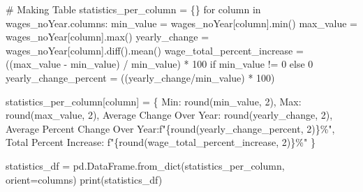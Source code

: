 \documentclass[
  letterpaper,
  DIV=11,
  numbers=noendperiod]{scrartcl}
\newenvironment{Shaded}{\begin{snugshade}}{\end{snugshade}}
\newcommand{\BuiltInTok}[1]{\textcolor[rgb]{0.00,0.23,0.31}{#1}}
\newcommand{\CommentTok}[1]{\textcolor[rgb]{0.37,0.37,0.37}{#1}}
\newcommand{\ControlFlowTok}[1]{\textcolor[rgb]{0.00,0.23,0.31}{#1}}
\newcommand{\DecValTok}[1]{\textcolor[rgb]{0.68,0.00,0.00}{#1}}
\newcommand{\KeywordTok}[1]{\textcolor[rgb]{0.00,0.23,0.31}{#1}}
\newcommand{\NormalTok}[1]{\textcolor[rgb]{0.00,0.23,0.31}{#1}}
\newcommand{\OperatorTok}[1]{\textcolor[rgb]{0.37,0.37,0.37}{#1}}
\newcommand{\SpecialCharTok}[1]{\textcolor[rgb]{0.37,0.37,0.37}{#1}}
\newcommand{\SpecialStringTok}[1]{\textcolor[rgb]{0.13,0.47,0.30}{#1}}
\newcommand{\StringTok}[1]{\textcolor[rgb]{0.13,0.47,0.30}{#1}}
\begin{document}
\begin{Shaded}
\begin{Highlighting}[]
\CommentTok{\# Making Table}
\NormalTok{statistics\_per\_column }\OperatorTok{=}\NormalTok{ \{\}}
\ControlFlowTok{for}\NormalTok{ column }\KeywordTok{in}\NormalTok{ wages\_noYear.columns:}
\NormalTok{    min\_value }\OperatorTok{=}\NormalTok{ wages\_noYear[column].}\BuiltInTok{min}\NormalTok{()}
\NormalTok{    max\_value }\OperatorTok{=}\NormalTok{ wages\_noYear[column].}\BuiltInTok{max}\NormalTok{()}
\NormalTok{    yearly\_change }\OperatorTok{=}\NormalTok{ wages\_noYear[column].diff().mean()}
\NormalTok{    wage\_total\_percent\_increase }\OperatorTok{=}\NormalTok{ ((max\_value }\OperatorTok{{-}}\NormalTok{ min\_value) }\OperatorTok{/}\NormalTok{ min\_value) }\OperatorTok{*} \DecValTok{100} \ControlFlowTok{if}\NormalTok{ min\_value }\OperatorTok{!=} \DecValTok{0} \ControlFlowTok{else} \DecValTok{0}
\NormalTok{    yearly\_change\_percent }\OperatorTok{=}\NormalTok{ ((yearly\_change}\OperatorTok{/}\NormalTok{min\_value) }\OperatorTok{*} \DecValTok{100}\NormalTok{)}

\NormalTok{    statistics\_per\_column[column] }\OperatorTok{=}\NormalTok{ \{}
        \StringTok{\textquotesingle{}Min\textquotesingle{}}\NormalTok{: }\BuiltInTok{round}\NormalTok{(min\_value, }\DecValTok{2}\NormalTok{),}
        \StringTok{\textquotesingle{}Max\textquotesingle{}}\NormalTok{: }\BuiltInTok{round}\NormalTok{(max\_value, }\DecValTok{2}\NormalTok{),}
        \StringTok{\textquotesingle{}Average Change Over Year\textquotesingle{}}\NormalTok{: }\BuiltInTok{round}\NormalTok{(yearly\_change, }\DecValTok{2}\NormalTok{),}
        \StringTok{\textquotesingle{}Average Percent Change Over Year\textquotesingle{}}\NormalTok{:}\SpecialStringTok{f"}\SpecialCharTok{\{}\BuiltInTok{round}\NormalTok{(yearly\_change\_percent, }\DecValTok{2}\NormalTok{)}\SpecialCharTok{\}}\SpecialStringTok{\%"}\NormalTok{,}
        \StringTok{\textquotesingle{}Total Percent Increase\textquotesingle{}}\NormalTok{: }\SpecialStringTok{f"}\SpecialCharTok{\{}\BuiltInTok{round}\NormalTok{(wage\_total\_percent\_increase, }\DecValTok{2}\NormalTok{)}\SpecialCharTok{\}}\SpecialStringTok{\%"}
\NormalTok{    \}}

\NormalTok{statistics\_df }\OperatorTok{=}\NormalTok{ pd.DataFrame.from\_dict(statistics\_per\_column, orient}\OperatorTok{=}\StringTok{\textquotesingle{}columns\textquotesingle{}}\NormalTok{)}
\BuiltInTok{print}\NormalTok{(statistics\_df)}
\end{Highlighting}
\end{Shaded}
\end{document}
